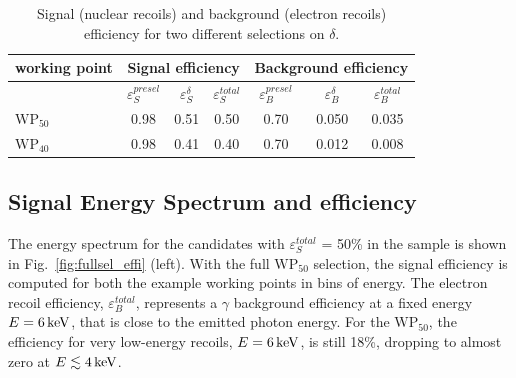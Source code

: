 \begin{table}[t]
\caption{Signal (nuclear recoils) and background (electron recoils) efficiency for
  two different selections on $\delta$.\label{tab:roc}}
\vspace{10pt}
\normalsize
\centering
\begin{tabular}{l c c c | c c c }
  \hline\hline
  working point & \multicolumn{3}{c}{Signal efficiency} & \multicolumn{3}{c}{Background efficiency} \\
  \hline
  & $\varepsilon_{S}^{presel}$ & $\varepsilon_{S}^{\delta}$ & $\varepsilon_{S}^{total}$ & $\varepsilon_{B}^{presel}$ & $\varepsilon_{B}^{\delta}$ & $\varepsilon_{B}^{total}$ \\
  \hline
  $\mathrm{WP}_{50}$  & 0.98                        & 0.51                      & 0.50                     & 0.70                     & 0.050                     & 0.035 \\
  $\mathrm{WP}_{40}$  & 0.98                        & 0.41                      & 0.40                     & 0.70                     & 0.012                     & 0.008 \\
  \hline\hline
\end{tabular}
\end{table}

\subsection{Signal Energy Spectrum and efficiency}
The energy spectrum for the candidates with $\varepsilon_{S}^{total}$
= 50\% in the \ambe sample is shown in Fig.~\ref{fig:fullsel_effi}
(left). With the full $\mathrm{WP}_{50}$ selection, the signal
efficiency is computed for both the example working points in bins of
energy. The electron recoil efficiency, $\varepsilon_{B}^{total}$,
represents a $\gamma$ background efficiency at a fixed energy
$E=6\,\textrm{ke\hspace{-.08em}V}$, that is close to the \fe emitted photon energy. For the
$\mathrm{WP}_{50}$, the efficiency for very low-energy recoils,
$E=6\,\textrm{ke\hspace{-.08em}V}$, is still 18\%, dropping to almost zero at $E\lesssim4\,\textrm{ke\hspace{-.08em}V}$.


